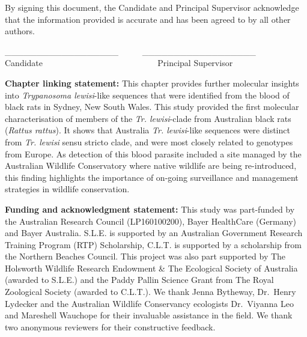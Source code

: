 \documentclass[a4paper, nobind]{templates/ociamthesis}
\begin{document}
By signing this document, the Candidate and Principal Supervisor acknowledge that the information provided is accurate and has been agreed to by all other authors.

\vspace{3mm}

\raggedright

\_\_\_\_\_\_\_\_\_\_\_\_\_\_\_\_\_\_ ~ ~ ~ \_\_\_\_\_\_\_\_\_\_\_\_\_\_\_\_\_\_\\
\hspace*{0.333em}\hspace*{0.333em}Candidate ~ ~ ~ ~ ~ ~ ~ ~ ~ ~ ~ ~ ~ ~ ~ ~ Principal Supervisor

\newpage

\textbf{Chapter linking statement:}
This chapter provides further molecular insights into \emph{Trypanosoma lewisi}-like sequences that were identified from the blood of black rats in Sydney, New South Wales. This study provided the first molecular characterisation of members of the \emph{Tr. lewisi}-clade from Australian black rats (\emph{Rattus rattus}). It shows that Australia \emph{Tr. lewisi}-like sequences were distinct from \emph{Tr. lewisi} sensu stricto clade, and were most closely related to genotypes from Europe. As detection of this blood parasite included a site managed by the Australian Wildlife Conservatory where native wildlife are being re-introduced, this finding highlights the importance of on-going surveillance and management strategies in wildlife conservation.

\vspace{5mm}

\textbf{Funding and acknowledgment statement:} This study was part-funded by the Australian Research Council (LP160100200), Bayer HealthCare (Germany) and Bayer Australia. S.L.E. is supported by an Australian Government Research Training Program (RTP) Scholarship, C.L.T. is supported by a scholarship from the Northern Beaches Council. This project was also part supported by The Holsworth Wildlife Research Endowment \& The Ecological Society of Australia (awarded to S.L.E.) and the Paddy Pallin Science Grant from The Royal Zoological Society (awarded to C.L.T.). We thank Jenna Bytheway, Dr.~Henry Lydecker and the Australian Wildlife Conservancy ecologists Dr.~Viyanna Leo and Mareshell Wauchope for their invaluable assistance in the field. We thank two anonymous reviewers for their constructive feedback.

\vspace{5mm}
\end{document}
